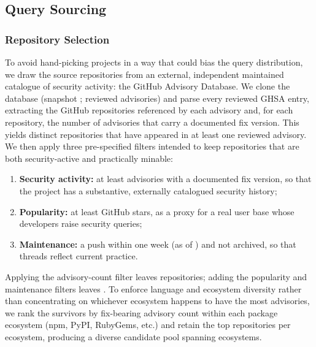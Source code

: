 \subsection{Query Sourcing}
\label{sec:phase-sourcing}

\subsubsection{Repository Selection}
\label{sec:repo-selection}

To avoid hand-picking projects in a way that could bias the query distribution, we draw the source repositories from an external, independent maintained catalogue of security activity: the GitHub Advisory Database. We clone the database (snapshot ;  reviewed advisories) and parse every reviewed GHSA entry, extracting the GitHub repositories referenced by each advisory and, for each repository, the number of advisories that carry a documented fix version. This yields  distinct repositories that have appeared in at least one reviewed advisory. We then apply three pre-specified filters intended to keep repositories that are
both security-active and practically minable:

\begin{enumerate}
  \item \textbf{Security activity:} at least  advisories with a
        documented fix version, so that the project has a substantive, externally
        catalogued security history;
  \item \textbf{Popularity:} at least  GitHub stars, as a proxy for
        a real user base whose developers raise security queries;
  \item \textbf{Maintenance:} a push within one week (as of ) and not archived, so that threads reflect current practice.
\end{enumerate}

Applying the advisory-count filter leaves  repositories; adding the
popularity and maintenance filters leaves . To enforce language and
ecosystem diversity rather than concentrating on whichever ecosystem happens to
have the most advisories, we rank the survivors by fix-bearing advisory count
within each package ecosystem (npm, PyPI, RubyGems, etc.) and retain the top
repositories per ecosystem, producing a diverse candidate pool spanning
 ecosystems.


